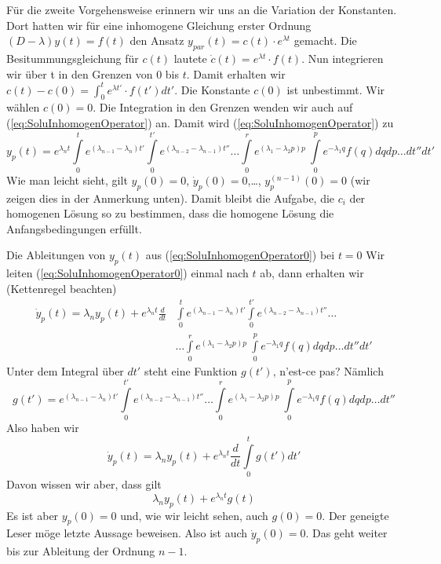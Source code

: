 Für die zweite Vorgehensweise erinnern wir uns an die Variation der Konstanten.
Dort hatten wir für eine inhomogene Gleichung erster Ordnung
$(D-\lambda)y(t)=f(t)$ den Ansatz $y_{par}(t)=c(t)\cdot e^{\lambda t}$ gemacht.
Die Besitummungsgleichung für $c(t)$ lautete $\dot c(t)=e^{\lambda t}\cdot
f(t)$. Nun integrieren wir über t in den Grenzen von $0$ bis $t$. Damit
erhalten wir $c(t)-c(0)=\int_0^te^{\lambda t'}\cdot f(t')dt'$. Die Konstante
$c(0)$ ist unbestimmt. Wir wählen $c(0)=0$. Die Integration in den Grenzen
wenden wir auch auf (\ref{eq:SoluInhomogenOperator}) an. Damit wird
(\ref{eq:SoluInhomogenOperator}) zu
\begin{equation}
  y_p(t)=e^{\lambda_n t}
\int\limits_0^t e^{(\lambda_{n-1}-\lambda_n) t'}
\int\limits_0^{t'} e^{(\lambda_{n-2}-\lambda_{n-1}) t''}\dots
\int\limits_0^{r} e^{(\lambda_{1}-\lambda_{2}p) p}\
\int\limits_0^{p} e^{-\lambda_{1}q}f(q)dqdp\dots dt''dt'
  \label{eq:SoluInhomogenOperator0}
\end{equation}
Wie man leicht sieht, gilt $y_p(0)=0$, $\dot y_p(0)=0$,\ldots,
$y^{(n-1)}_p(0)=0$ (wir zeigen dies in der Anmerkung unten). Damit bleibt die
Aufgabe, die $c_i$ der homogenen Lösung so zu bestimmen, dass die homogene
Lösung die Anfangsbedingungen erfüllt.
\begin{note}{Die Ableitungen von $y_p(t)$ aus (\ref{eq:SoluInhomogenOperator0}) bei $t=0$}
Wir leiten (\ref{eq:SoluInhomogenOperator0}) einmal nach $t$ ab, dann erhalten
wir (Kettenregel beachten)
\begin{align} \dot y_p(t)=\lambda_n y_p(t)+
e^{\lambda_n t}\frac{d}{dt}&
\int\limits_0^t e^{(\lambda_{n-1}-\lambda_n) t'}
\int\limits_0^{t'} e^{(\lambda_{n-2}-\lambda_{n-1}) t''}\dots\\
&\dots\int\limits_0^{r} e^{(\lambda_{1}-\lambda_{2}p) p}\
\int\limits_0^{p} e^{-\lambda_{1}q}f(q)dqdp\dots dt''dt'\nonumber
\end{align}
Unter dem Integral über $dt'$ steht eine Funktion $g(t')$, n'est-ce pas? Nämlich
\[g(t')=e^{(\lambda_{n-1}-\lambda_n) t'}
\int\limits_0^{t'} e^{(\lambda_{n-2}-\lambda_{n-1}) t''}\dots
\int\limits_0^{r} e^{(\lambda_{1}-\lambda_{2}p) p}\
\int\limits_0^{p} e^{-\lambda_{1}q}f(q)dqdp\dots dt''
\]
Also haben wir
\[ \dot y_p(t)=\lambda_n y_p(t)+e^{\lambda_n t}\frac{d}{dt}
\int\limits_0^t g(t')dt'
\]
Davon wissen wir aber, dass gilt
\[ \lambda_n y_p(t)+e^{\lambda_n t} g(t)
\]
Es ist aber $y_p(0)=0$ und, wie wir leicht sehen, auch $g(0)=0$. Der geneigte Leser möge letzte Aussage beweisen. Also ist auch $\dot y_p(0)=0$. Das geht weiter bis zur Ableitung der Ordnung $n-1$.
\end{note}
%
